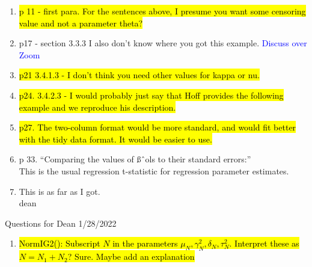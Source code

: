 \documentclass[12pt, a4paper]{article}
\begin{document}
\begin{enumerate}
  \item \hl{p 11 - first para.  For the sentences above, I presume you want some censoring value and not a parameter theta?}
  \item p17 - section 3.3.3  I also don't know where you got this example. \textcolor{blue}{Discuss over Zoom}
  \item \hl{p21 3.4.1.3 - I don't think you need other values for kappa or nu.}
  \item \hl{p24. 3.4.2.3 - I would probably just say that Hoff provides the following example and we reproduce his description.}
  \item \hl{p27. The two-column format would be more standard, and would fit better with the tidy data format.  It would be easier to use.}
  \item p 33.  ``Comparing the values of ßˆols to their standard errors:”\\
    This is the usual regression t-statistic for regression parameter estimates.
  \item This is as far as I got.\\
    dean

\end{enumerate}

{\huge Questions for Dean 1/28/2022}
\begin{enumerate}
  \item \hl{NormIG2():  Subscript $N$ in the parameters $\mu_N,\gamma^2_N,\delta_N,\tau^2_N$. Interpret these as $N = N_1 + N_2$?  Sure.  Maybe add an explanation}
\end{enumerate}
\end{document}
